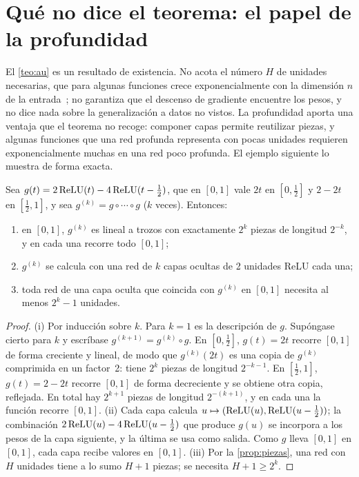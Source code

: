 \section{Qué no dice el teorema: el papel de la profundidad}

El \cref{teo:au} es un resultado de existencia. No acota el número $H$ de unidades necesarias, que para algunas funciones crece exponencialmente con la dimensión $n$ de la entrada~\cite[§6.4.1]{gbc}; no garantiza que el descenso de gradiente encuentre los pesos, y no dice nada sobre la generalización a datos no vistos. La profundidad aporta una ventaja que el teorema no recoge: componer capas permite reutilizar piezas, y algunas funciones que una red profunda representa con pocas unidades requieren exponencialmente muchas en una red poco profunda. El ejemplo siguiente lo muestra de forma exacta.

\begin{proposicion}\label{prop:sierra}
Sea $g(t)=2\operatorname{ReLU}(t)-4\operatorname{ReLU}(t-\tfrac12)$, que en $[0,1]$ vale $2t$ en $[0,\tfrac12]$ y $2-2t$ en $[\tfrac12,1]$, y sea $g^{(k)}=g\circ\cdots\circ g$ ($k$ veces). Entonces:
\begin{enumerate}
  \item en $[0,1]$, $g^{(k)}$ es lineal a trozos con exactamente $2^{k}$ piezas de longitud $2^{-k}$, y en cada una recorre todo $[0,1]$;
  \item $g^{(k)}$ se calcula con una red de $k$ capas ocultas de 2 unidades ReLU cada una;
  \item toda red de una capa oculta que coincida con $g^{(k)}$ en $[0,1]$ necesita al menos $2^{k}-1$ unidades.
\end{enumerate}
\end{proposicion}

\begin{proof}
(i) Por inducción sobre $k$. Para $k=1$ es la descripción de $g$. Supóngase cierto para $k$ y escríbase $g^{(k+1)}=g^{(k)}\circ g$. En $[0,\tfrac12]$, $g(t)=2t$ recorre $[0,1]$ de forma creciente y lineal, de modo que $g^{(k)}(2t)$ es una copia de $g^{(k)}$ comprimida en un factor~2: tiene $2^{k}$ piezas de longitud $2^{-k-1}$. En $[\tfrac12,1]$, $g(t)=2-2t$ recorre $[0,1]$ de forma decreciente y se obtiene otra copia, reflejada. En total hay $2^{k+1}$ piezas de longitud $2^{-(k+1)}$, y en cada una la función recorre $[0,1]$. (ii) Cada capa calcula $u\mapsto(\operatorname{ReLU}(u),\operatorname{ReLU}(u-\tfrac12))$; la combinación $2\operatorname{ReLU}(u)-4\operatorname{ReLU}(u-\tfrac12)$ que produce $g(u)$ se incorpora a los pesos de la capa siguiente, y la última se usa como salida. Como $g$ lleva $[0,1]$ en $[0,1]$, cada capa recibe valores en $[0,1]$. (iii) Por la \cref{prop:piezas}, una red con $H$ unidades tiene a lo sumo $H+1$ piezas; se necesita $H+1\ge 2^{k}$.
\end{proof}

